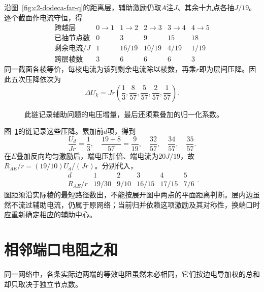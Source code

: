 \begin{solution}
沿图~\ref{fig:c2-dodeca-far-q}的距离层，辅助激励仍取$A$注$J$、其余十九点各抽$J/19$。逐个截面作电流守恒，得
\[
 \begin{array}{c|ccccc}
 \text{跨越层}&0\to1&1\to2&2\to3&3\to4&4\to5\\\hline
 \text{已抽节点数}&0&3&9&15&18\\
 \text{剩余电流}/J&1&16/19&10/19&4/19&1/19\\
 \text{跨层棱数}&3&6&6&6&3
 \end{array}
\]
同一截面各棱等价，每棱电流为该列剩余电流除以棱数，再乘$r$即为层间压降。因此五次压降依次为
\[
 \Delta U_k=Jr\left(\frac13,\frac8{57},\frac5{57},\frac2{57},\frac1{57}\right).
\]
\begin{figure}[H]\centering
{}
\caption{此链记录辅助问题的电压增量，最后还须乘叠加的归一化系数。}\label{fig:c2-dodeca-far-s}
\end{figure}
图~\ref{fig:c2-dodeca-far-s}的链记录这些压降。累加前$d$项，得到
\[
 \frac{U_d}{Jr}=\frac13,\quad\frac{19+8}{57}=\frac9{19},\quad
 \frac{32}{57},\quad\frac{34}{57},\quad\frac{35}{57}.
\]
在$E$叠加反向均匀激励后，端电压加倍、端电流为$20J/19$，故$R_{AE}/r=(19/10)U_d/(Jr)$。分别代入，
\[
 \boxed{\begin{array}{c|ccccc}d&1&2&3&4&5\\\hline
 R_{AE}/r&19/30&9/10&16/15&17/15&7/6\end{array}}.
\]
图距须沿实际棱的最短路径数出，不能按展开图中两点的平面距离判断。层内边虽然不流过辅助电流，仍属于原网络；当前归并依赖这项激励及其对称性，换端口时应重新确定相应的辅助中心。
\end{solution}


\section{相邻端口电阻之和}\label{sec:c2-foster}
同一网络中，各条实际边两端的等效电阻虽然未必相同，它们按边电导加权的总和却只取决于独立节点数。


